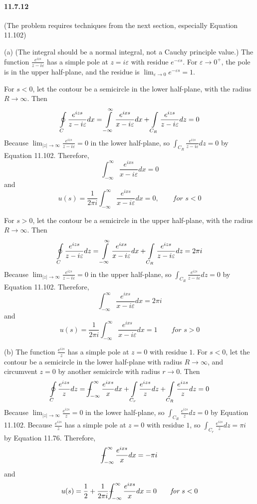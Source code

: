\documentclass[a4paper]{article}
\begin{document}
\paragraph{11.7.12}
(The problem requires techniques from the next section, especially Equation 11.102)
\medskip

(a) (The integral should be a normal integral, not a Cauchy principle value.) The function $\frac{e^{izs}}{z-i\varepsilon}$ has a simple pole at $z=i\varepsilon$ with residue $e^{-\varepsilon s}$. For $\varepsilon\to0^+$, the pole is in the upper half-plane, and the residue is $\lim_{\varepsilon\to0}e^{-\varepsilon s}=1$.

For $s<0$, let the contour be a semicircle in the lower half-plane, with the radius $R\to\infty$. Then
\[
\oint\displaylimits_C\frac{e^{izs}}{z-i\varepsilon}dx=\int\displaylimits_{-\infty}^\infty\frac{e^{ixs}}{x-i\varepsilon}dx+\int\displaylimits_{C_R}\frac{e^{izs}}{z-i\varepsilon}dz=0
\]
Because $\lim_{|z|\to\infty}\frac{e^{izs}}{z-i\varepsilon}=0$ in the lower half-plane, so $\int_{C_R}\frac{e^{izs}}{z-i\varepsilon}dz=0$ by Equation 11.102. Therefore, 
\[
\int_{-\infty}^\infty\frac{e^{ixs}}{x-i\varepsilon}dx=0
\]
and 
\[
u(s)=\frac{1}{2\pi i}\int_{-\infty}^\infty\frac{e^{ixs}}{x-i\varepsilon}dx=0,\qquad\textit{for $s<0$}
\]

For $s>0$, let the contour be a semicircle in the upper half-plane, with the radius $R\to\infty$. Then
\[
\oint\displaylimits_C\frac{e^{izs}}{z-i\varepsilon}dz=\int\displaylimits_{-\infty}^\infty\frac{e^{ixs}}{x-i\varepsilon}dx+\int\displaylimits_{C_R}\frac{e^{izs}}{z-i\varepsilon}dz=2\pi i
\]
Because $\lim_{|z|\to\infty}\frac{e^{izs}}{z-i\varepsilon}=0$ in the upper half-plane, so $\int_{C_R}\frac{e^{izs}}{z-i\varepsilon}dz=0$ by Equation 11.102. Therefore,
\[
\int_{-\infty}^\infty\frac{e^{ixs}}{x-i\varepsilon}dx=2\pi i
\]
and
\[
u(s)=\frac{1}{2\pi i}\int_{-\infty}^\infty\frac{e^{ixs}}{x-i\varepsilon}dx=1\qquad\textit{for $s>0$}
\]

(b)
The function $\frac{e^{izs}}{z}$ has a simple pole at $z=0$ with residue $1$.
For $s<0$, let the contour be a semicircle in the lower half-plane with radius $R\to\infty$, and circumvent $z=0$ by another semicircle with radius $r\to0$. Then
\[
\oint\displaylimits_C\frac{e^{izs}}{z}dz=\dashint_{-\infty}^\infty\frac{e^{ixs}}{x}dx+\int\displaylimits_{C_r}\frac{e^{izs}}{z}dz+\int\displaylimits_{C_R}\frac{e^{izs}}{z}dz=0
\]
Because $\lim_{|z|\to\infty}\frac{e^{izs}}{z}=0$ in the lower half-plane, so $\int_{C_R}\frac{e^{izs}}{z}dz=0$ by Equation 11.102. Because $\frac{e^{izs}}{z}$ has a simple pole at $z=0$ with residue $1$, so $\int_{C_r}\frac{e^{izs}}{z}dz=\pi i$ by Equation 11.76. Therefore,
\[
\dashint_{-\infty}^\infty\frac{e^{ixs}}{x}dx=-\pi i
\]
and
\[
u(s)=\frac{1}{2}+\frac{1}{2\pi i}\dashint_{-\infty}^\infty\frac{e^{ixs}}{x}dx=0\qquad\textit{for $s<0$}
\]
\end{document}
